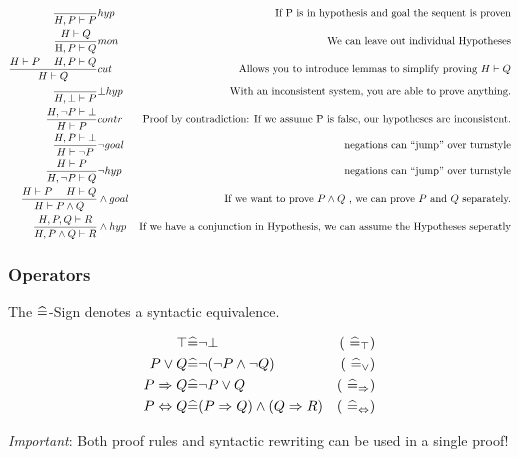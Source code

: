 \begin{align*}
	  \frac{}{H,P \vdash P}
	& hyp
	& \text{If P is in hypothesis and goal the sequent is proven} \\
		\frac{H \vdash Q}{\text{H},P \vdash Q}
	& mon
	& \text{We can leave out individual Hypotheses} \\
	  \frac{H \vdash P \text{ }\text{ }\text{ }\text{ } H, P \vdash Q}{H \vdash Q}
	& cut
	& \text{Allows you to introduce lemmas to simplify proving } H \vdash Q \\
	\frac{}{H, \bot \vdash P}
	& \bot hyp
	& \text{With an inconsistent system, you are able to prove anything.} \\
	\frac{H, \neg P \vdash \bot}{H \vdash P}
	& contr
	& \text{Proof by contradiction: If we assume P is false, our hypotheses are inconsistent.} \\
	\frac{H, P \vdash \bot}{H \vdash \neg P}
	& \neg goal
	& \text{negations can “jump” over turnstyle} \\
	\frac{H \vdash P}{H, \neg P \vdash Q}
	& \neg hyp
	& \text{negations can “jump” over turnstyle} \\
	\frac{H \vdash P \text{ }\text{ }\text{ }\text{ } H \vdash Q}{H \vdash P \land Q}
	& \land goal
	& \text{If we want to prove } P \land Q \text{ , we can prove } P \text{ and } Q \text{ separately.} \\
	\frac{H,P,Q \vdash R}{H,P \land Q \vdash R}
	& \land hyp
	&	\text{If we have a conjunction in Hypothesis, we can assume the Hypotheses seperatly}
\end{align*}

\subsubsection{Operators}

The $\widehat{=}$-Sign denotes a syntactic equivalence.

\begin{align*}
	\top & \widehat{=} \neg \bot 
	& \text{( $\widehat{=}_{\top}$)} \\
	P \lor Q & \widehat{=} \neg(\neg P \land \neg Q)
	& \text{( $\widehat{=}_{\lor}$)} \\
	P \Rightarrow Q & \widehat{=} \neg P \lor Q
	& \text{( $\widehat{=}_{\Rightarrow}$)} \\
	P \Leftrightarrow Q & \widehat{=} (P\Rightarrow Q) \land (Q \Rightarrow R)
	& \text{( $\widehat{=}_{\Leftrightarrow}$)} \\
\end{align*}

\emph{Important}: Both proof rules and syntactic rewriting can be used in a single proof!

